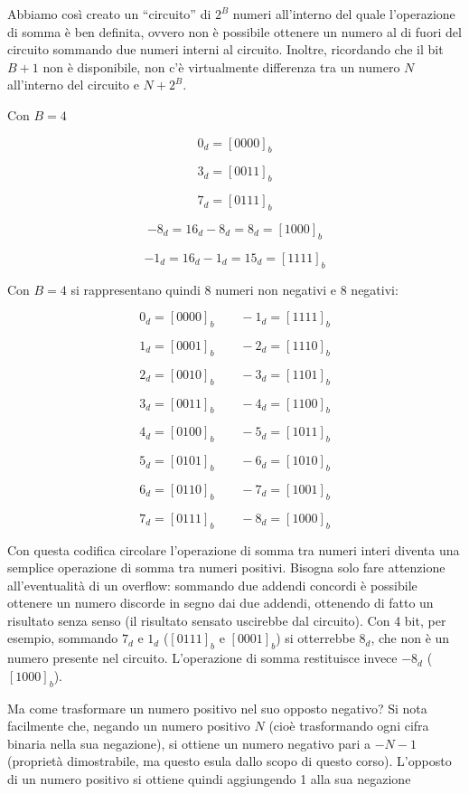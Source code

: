 \documentclass{article}
\begin{document}
\vspace{3mm}

Abbiamo così creato un ``circuito'' di $2^B$ numeri all'interno del quale l'operazione di somma è ben definita, ovvero non è possibile ottenere un numero al di fuori del circuito sommando due numeri interni al circuito. Inoltre, ricordando che il bit $B + 1$ non è disponibile, non c'è virtualmente differenza tra un numero $N$ all'interno del circuito e $N + 2^B$.

\vspace{1mm}

Con $B = 4$

\[0_d = [0000]_b\]

\[3_d = [0011]_b\]

\[7_d = [0111]_b\]

\[-8_d = 16_d - 8_d = 8_d = [1000]_b\]

\[-1_d = 16_d - 1_d = 15_d = [1111]_b\]

Con $B = 4$ si rappresentano quindi 8 numeri non negativi e 8 negativi:

\[0_d = [0000]_b\quad \quad -1_d = [1111]_b\]

\[1_d = [0001]_b\quad \quad -2_d = [1110]_b\]

\[2_d = [0010]_b\quad \quad -3_d = [1101]_b\]

\[3_d = [0011]_b\quad \quad -4_d = [1100]_b\]

\[4_d = [0100]_b\quad \quad -5_d = [1011]_b\]

\[5_d = [0101]_b\quad \quad -6_d = [1010]_b\]

\[6_d = [0110]_b\quad \quad -7_d = [1001]_b\]

\[7_d = [0111]_b\quad \quad -8_d = [1000]_b\]

Con questa codifica circolare l'operazione di somma tra numeri interi diventa una semplice operazione di somma tra numeri positivi. Bisogna solo fare attenzione all'eventualità di un overflow: sommando due addendi concordi è possibile ottenere un numero discorde in segno dai due addendi, ottenendo di fatto un risultato senza senso (il risultato sensato uscirebbe dal circuito). Con 4 bit, per esempio, sommando $7_d$ e $1_d$ ($[0111]_b$ e $[0001]_b$) si otterrebbe $8_d$, che non è un numero presente nel circuito. L'operazione di somma restituisce invece $-8_d$ ($[1000]_b$). 

\vspace{3mm}

Ma come trasformare un numero positivo nel suo opposto negativo? Si nota facilmente che, negando un numero positivo $N$ (cioè trasformando ogni cifra binaria nella sua negazione), si ottiene un numero negativo pari a $-N -1$ (proprietà dimostrabile, ma questo esula dallo scopo di questo corso). L'opposto di un numero positivo si ottiene quindi aggiungendo 1 alla sua negazione
\end{document}
